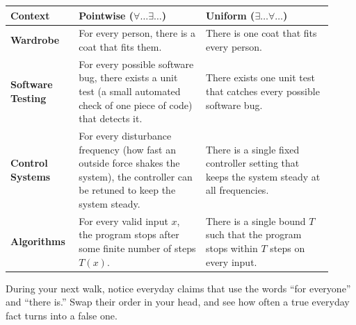 \begin{longtable}{p{0.18\linewidth}p{0.37\linewidth}p{0.37\linewidth}}
\toprule
\textbf{Context} & \textbf{Pointwise ($\forall \dots \exists \dots$)} & \textbf{Uniform ($\exists \dots \forall \dots$)} \\
\midrule
\textbf{Wardrobe} & For every person, there is a coat that fits them. & There is one coat that fits every person. \\
\addlinespace
\textbf{Software Testing} & For every possible software bug, there exists a unit test (a small automated check of one piece of code) that detects it. & There exists one unit test that catches every possible software bug. \\
\addlinespace
\textbf{Control Systems} & For every disturbance frequency (how fast an outside force shakes the system), the controller can be retuned to keep the system steady. & There is a single fixed controller setting that keeps the system steady at all frequencies. \\
\addlinespace
\textbf{Algorithms} & For every valid input $x$, the program stops after some finite number of steps $T(x)$. & There is a single bound $T$ such that the program stops within $T$ steps on every input. \\
\bottomrule
\end{longtable}

\begin{walkbox}
During your next walk, notice everyday claims that use the words ``for everyone'' and ``there is.'' Swap their order in your head, and see how often a true everyday fact turns into a false one.
\end{walkbox}

